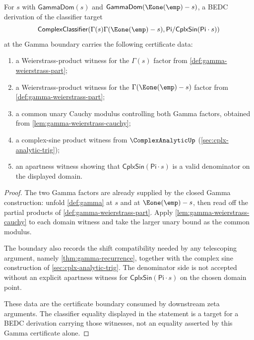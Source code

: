 \begin{theorem}
\label{thm:gamma-reflection}
For $s$ with $\mathsf{GammaDom}(s)$ and $\mathsf{GammaDom}(\Eone(\emp) - s)$, a BEDC derivation of the classifier target
$$
\mathsf{ComplexClassifier}\!\left(\Gamma(s)\Gamma(\Eone(\emp)-s), \mathsf{Pi} / \mathsf{CplxSin}(\mathsf{Pi}\cdot s)\right)
$$
at the Gamma boundary carries the following certificate data:
\begin{enumerate}
  \item a Weierstrass-product witness for the $\Gamma(s)$ factor from \autoref{def:gamma-weierstrass-part};
  \item a Weierstrass-product witness for the $\Gamma(\Eone(\emp)-s)$ factor from \autoref{def:gamma-weierstrass-part};
  \item a common unary Cauchy modulus controlling both Gamma factors, obtained from \autoref{lem:gamma-weierstrass-cauchy};
  \item a complex-sine product witness from $\ComplexAnalyticUp$ (\autoref{sec:cplx-analytic-trig});
  \item an apartness witness showing that $\mathsf{CplxSin}(\mathsf{Pi}\cdot s)$ is a valid denominator on the displayed domain.
\end{enumerate}
\end{theorem}
\begin{proof}
The two Gamma factors are already supplied by the closed Gamma construction: unfold \autoref{def:gamma} at $s$ and at $\Eone(\emp)-s$, then read off the partial products of \autoref{def:gamma-weierstrass-part}. Apply \autoref{lem:gamma-weierstrass-cauchy} to each domain witness and take the larger unary bound as the common modulus.

The boundary also records the shift compatibility needed by any telescoping argument, namely \autoref{thm:gamma-recurrence}, together with the complex sine construction of \autoref{sec:cplx-analytic-trig}. The denominator side is not accepted without an explicit apartness witness for $\mathsf{CplxSin}(\mathsf{Pi}\cdot s)$ on the chosen domain point.

These data are the certificate boundary consumed by downstream zeta arguments. The classifier equality displayed in the statement is a target for a BEDC derivation carrying those witnesses, not an equality asserted by this Gamma certificate alone.
\end{proof}

